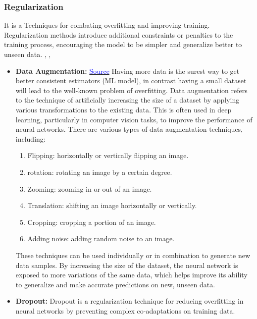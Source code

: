 \begin{itemize}
\subsubsection{Regularization}
It is a Techniques for combating overfitting and improving training. Regularization methods introduce additional constraints or penalties to the training process, encouraging the model to be simpler and generalize better to unseen data. \cite{goodfellow2016deep}, \cite{ansari2020building}, \cite{bishop2006pattern}
\begin{itemize}
    \item \textbf{Data Augmentation: } \href{https://research.aimultiple.com/data-augmentation-techniques/}{\textcolor{blue}{Source}}
    Having more data is the surest way to get better consistent estimators (ML model), in contrast having a small dataset will lead to the well-known problem of overfitting.
    Data augmentation refers to the technique of artificially increasing the size of a dataset by applying various transformations to the existing data. This is often used in deep learning, particularly in computer vision tasks, to improve the performance of neural networks.
    There are various types of data augmentation techniques, including:
    \begin{enumerate}
        \item  Flipping: horizontally or vertically flipping an image.
        \item rotation: rotating an image by a certain degree.
        \item Zooming: zooming in or out of an image.
        \item Translation: shifting an image horizontally or vertically.
        \item Cropping: cropping a portion of an image.
        \item Adding noise: adding random noise to an image.
        
    \end{enumerate}
    
    These techniques can be used individually or in combination to generate new data samples. By increasing the size of the dataset, the neural network is exposed to more variations of the same data, which helps improve its ability to generalize and make accurate predictions on new, unseen data. \cite{shorten2019survey}\\
    \item \textbf{Dropout: } Dropout is a regularization technique for reducing overfitting in neural networks by preventing complex co-adaptations on training data.


\end{itemize}
\end{itemize}
